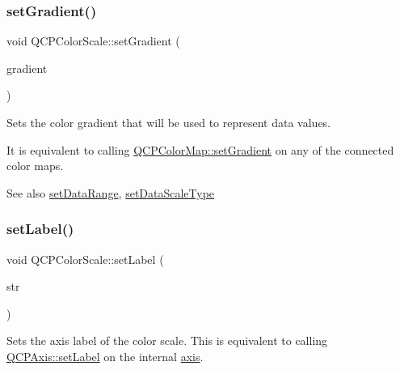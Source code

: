 \subsubsection{\texorpdfstring{set\+Gradient()}{setGradient()}}
{\footnotesize\ttfamily void Q\+C\+P\+Color\+Scale\+::set\+Gradient (\begin{DoxyParamCaption}\item[{const \hyperlink{class_q_c_p_color_gradient}{Q\+C\+P\+Color\+Gradient} \&}]{gradient }\end{DoxyParamCaption})}

Sets the color gradient that will be used to represent data values.

It is equivalent to calling \hyperlink{class_q_c_p_color_map_a7313c78360471cead3576341a2c50377}{Q\+C\+P\+Color\+Map\+::set\+Gradient} on any of the connected color maps.

\begin{DoxySeeAlso}{See also}
\hyperlink{class_q_c_p_color_scale_abe88633003a26d1e756aa74984587fef}{set\+Data\+Range}, \hyperlink{class_q_c_p_color_scale_aeb6107d67dd7325145b2498abae67fc3}{set\+Data\+Scale\+Type} 
\end{DoxySeeAlso}
\mbox{\label{class_q_c_p_color_scale_aee124ae8396320cacf8276e9a0fbb8ce}} 
\subsubsection{\texorpdfstring{set\+Label()}{setLabel()}}
{\footnotesize\ttfamily void Q\+C\+P\+Color\+Scale\+::set\+Label (\begin{DoxyParamCaption}\item[{const Q\+String \&}]{str }\end{DoxyParamCaption})}

Sets the axis label of the color scale. This is equivalent to calling \hyperlink{class_q_c_p_axis_a33bcc382c111c9f31bb0687352a2dea4}{Q\+C\+P\+Axis\+::set\+Label} on the internal \hyperlink{class_q_c_p_color_scale_a39bdbdb3b212602a5a57f9f3ea444190}{axis}. \mbox{\label{class_q_c_p_color_scale_a21c51a55e4fd581b6feadca9ee5b38d5}} 
